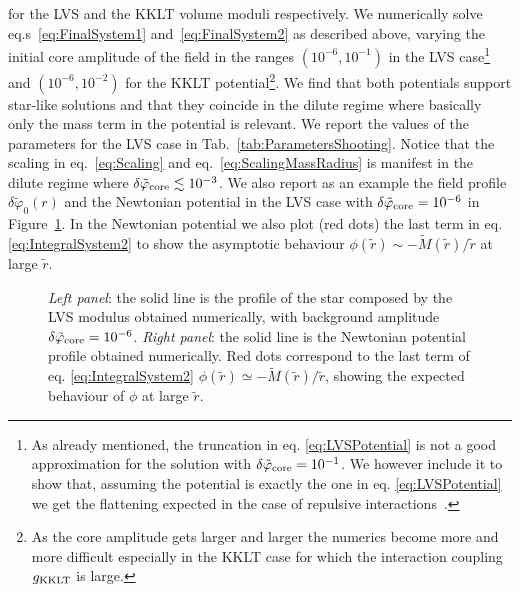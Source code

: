 \documentclass[11pt,a4paper]{article}
\begin{document}
for the LVS and the KKLT volume moduli respectively. We numerically solve eq.s~\eqref{eq:FinalSystem1} and~\eqref{eq:FinalSystem2} as described above, varying the initial core amplitude of the field in the ranges $(10^{-6},10^{-1})$ in the LVS case\footnote{As already mentioned, the truncation in eq. \eqref{eq:LVSPotential} is not a good approximation for the solution with $\delta\tilde\varphi_{\rm core} = 10^{-1}$. We however include it to show that, assuming the potential is exactly the one in eq. \eqref{eq:LVSPotential} we get the flattening expected in the case of repulsive interactions~\cite{Schiappacasse:2017ham}.} and $(10^{-6},10^{-2})$ for the KKLT potential\footnote{As the core amplitude gets larger and larger the numerics become more and more difficult especially in the KKLT case for which the interaction coupling $g_{\rm KKLT}$ is large.}. We find that both potentials support star-like solutions and that they coincide in the dilute regime where basically only the mass term in the potential is relevant. We report the values of the parameters for the LVS case in Tab.~\ref{tab:ParametersShooting}. Notice that the scaling in eq.~\eqref{eq:Scaling} and eq.~\eqref{eq:ScalingMassRadius} is manifest in the dilute regime where $\delta\tilde{\varphi}_{\rm core} \lesssim 10^{-3}$. We also report as an example the field profile $\delta\tilde\varphi_0(r)$ and the Newtonian potential in the LVS case with $\delta\tilde\varphi_{\rm core} = 10^{-6}$ in Figure~\ref{fig:StarProfile}. In the Newtonian potential we also plot (red dots) the last term in eq. \eqref{eq:IntegralSystem2} to show the asymptotic behaviour $\phi(\tilde{r}) \sim - \tilde{M}(\tilde{r})/\tilde{r}$ at large $\tilde{r}$.
\begin{figure}
\hfill
{}
\caption{\textit{Left panel}: the solid line is the profile of the star composed by the LVS modulus obtained numerically, with background amplitude $\delta\tilde\varphi_{\rm core} = 10^{-6}$. \textit{Right panel}: the solid line is the Newtonian potential profile obtained numerically. Red dots correspond to the last term of eq. \eqref{eq:IntegralSystem2} $\phi(\tilde{r}) \simeq - \tilde{M}(\tilde{r})/\tilde{r}$, showing the expected behaviour of $\phi$ at large $\tilde{r}$.\label{fig:StarProfile}}
\end{figure}
\end{document}
